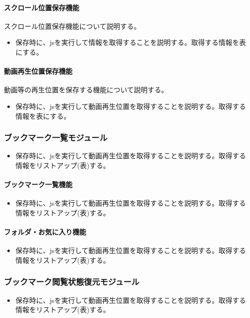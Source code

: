 \paragraph{スクロール位置保存機能}
スクロール位置保存機能について説明する。
\begin{itemize}
  \item 保存時に、jsを実行して情報を取得することを説明する。取得する情報を表にする。
\end{itemize}

\paragraph{動画再生位置保存機能}
動画等の再生位置を保存する機能について説明する。
\begin{itemize}
  \item 保存時に、jsを実行して動画再生位置を取得することを説明する。取得する情報を表にする。
\end{itemize}

\subsubsection{ブックマーク一覧モジュール}
\begin{itemize}
  \item 保存時に、jsを実行して動画再生位置を取得することを説明する。取得する情報をリストアップ(表)する。
\end{itemize}

\paragraph{ブックマーク一覧機能}
\begin{itemize}
  \item 保存時に、jsを実行して動画再生位置を取得することを説明する。取得する情報をリストアップ(表)する。
\end{itemize}

\paragraph{フォルダ・お気に入り機能}
\begin{itemize}
  \item 保存時に、jsを実行して動画再生位置を取得することを説明する。取得する情報をリストアップ(表)する。
\end{itemize}

\subsubsection{ブックマーク閲覧状態復元モジュール}
\begin{itemize}
  \item 保存時に、jsを実行して動画再生位置を取得することを説明する。取得する情報をリストアップ(表)する。
\end{itemize}

